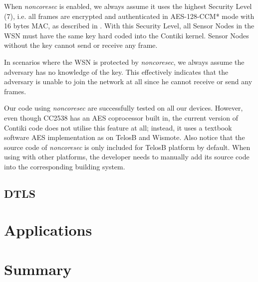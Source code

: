 When \textit{noncoresec} is enabled, we always assume it uses the highest Security Level (7), i.e. all frames are encrypted and authenticated in AES-128-CCM* mode with 16 bytes MAC, as described in . With this Security Level, all Sensor Nodes in the WSN must have the same key hard coded into the Contiki kernel. Sensor Nodes without the key cannot send or receive any frame.

In scenarios where the WSN is protected by \textit{noncoresec}, we always assume the adversary has no knowledge of the key. This effectively indicates that the adversary is unable to join the network at all since he cannot receive or send any frames.

Our code using \textit{noncoresec} are successfully tested on all our devices. However, even though CC2538 has an AES coprocessor built in, the current version of Contiki code does not utilise this feature at all; instead, it uses a textbook software AES implementation as on TelosB and Wismote. Also notice that the source code of \textit{noncoresec} is only included for TelosB platform by default. When using with other platforms, the developer needs to manually add its source code into the corresponding building system.

\subsection{DTLS}

\section{Applications}

\section{Summary}



